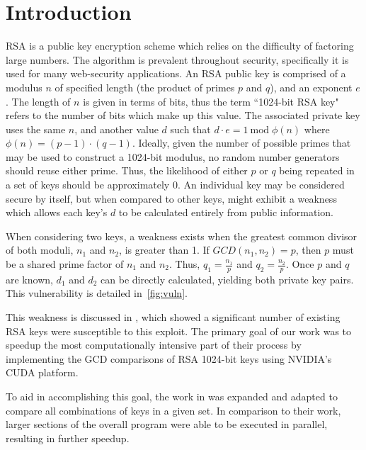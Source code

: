\documentclass[smallextended]{svjour3}       %
\begin{document}

\section{Introduction}
\label{sec:intro}
RSA is a public key encryption scheme which relies on the difficulty of 
factoring large numbers. The algorithm is prevalent throughout security, 
specifically it is used for many web-security applications. An RSA public key is 
comprised of a modulus $n$ of specified length (the product of primes $p$ and 
$q$), and an exponent $e$. The length of $n$ is given in terms of bits, thus 
the term ``1024-bit RSA key" refers to the number of bits which make up this 
value. The associated private key uses the same $n$, and another value $d$ such 
that $d \cdot e = 1 \:\text{mod} \;\phi(n)$ where $\phi(n) = (p - 1) \cdot
(q - 1)$\cite{rivest1978method}. Ideally, given the number of possible primes that may be
used to construct a 1024-bit modulus, no random number generators should reuse
either prime. Thus, the likelihood of either $p$ or $q$ being repeated in a set
of keys should be approximately 0. An individual key may be considered secure by
itself, but when compared to other keys, might exhibit a weakness which allows
each key's $d$ to be calculated entirely from public information.

When considering two keys, a weakness exists when the greatest common 
divisor of both moduli, $n_1$ and $n_2$, is greater than 1. If $GCD(n_1, 
n_2) = p$, then $p$ must be a shared prime factor of $n_1$ and $n_2$. Thus, 
$q_1 = \frac{n_1}{p}$ and $q_2 = \frac{n_2}{p}$. Once $p$ and $q$ are known, 
$d_1$ and $d_2$ can be directly calculated, yielding both private key pairs.
This vulnerability is detailed in~\ref{fig:vuln}.

This weakness is discussed in \cite{lenstra2012ron}, which showed a 
significant number of existing RSA keys were susceptible to this exploit. The 
primary goal of our work was to speedup the most computationally intensive 
part of their process by implementing the GCD comparisons of RSA 1024-bit keys 
using NVIDIA's CUDA platform.

To aid in accomplishing this goal, the work in \cite{fujimoto2009high} was 
expanded and adapted to compare all combinations of keys in a given set. In 
comparison to their work, larger sections of the overall program were able to 
be executed in parallel, resulting in further speedup.
\end{document}
